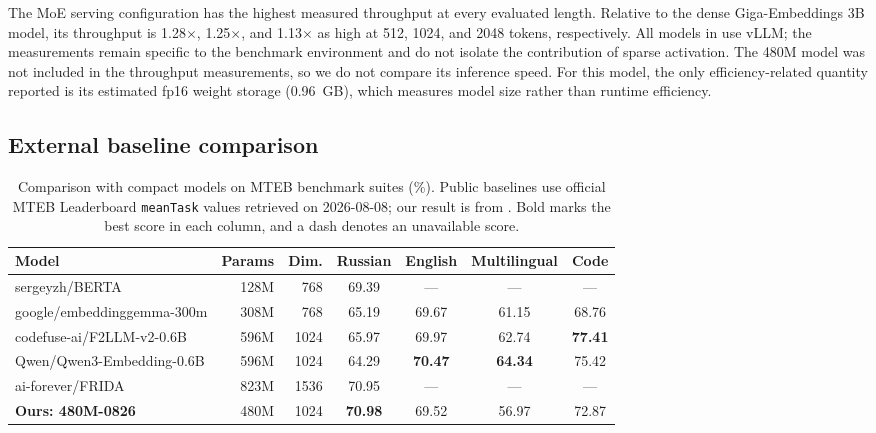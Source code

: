 \documentclass{article}
\begin{document}
The MoE serving configuration has the highest measured throughput at every evaluated length.
Relative to the dense Giga-Embeddings 3B model, its throughput is 1.28$\times$, 1.25$\times$, and 1.13$\times$ as high at 512, 1024, and 2048 tokens, respectively.
All models in  use vLLM; the measurements remain specific to the benchmark environment and do not isolate the contribution of sparse activation.
The 480M model was not included in the throughput measurements, so we do not compare its inference speed.
For this model, the only efficiency-related quantity reported is its estimated fp16 weight storage (0.96~GB), which measures model size rather than runtime efficiency.

\subsection{External baseline comparison}

\begin{table}[!t]
  \caption{Comparison with compact models on MTEB benchmark suites (\%). Public baselines use official MTEB Leaderboard \texttt{meanTask} values retrieved on 2026-08-08; our result is from . Bold marks the best score in each column, and a dash denotes an unavailable score.}
  \label{tab:baselines}
  \centering
  \small
  \setlength{\tabcolsep}{5pt}
  \begin{tabular}{lrrcccc}
    \toprule
    \textbf{Model} & \textbf{Params} & \textbf{Dim.} & \textbf{Russian} & \textbf{English} & \textbf{Multilingual} & \textbf{Code} \\
    \midrule
    sergeyzh/BERTA                              & 128M & 768  & 69.39 & --- & --- & --- \\
    google/embeddinggemma-300m                  & 308M & 768  & 65.19 & 69.67 & 61.15 & 68.76 \\
    codefuse-ai/F2LLM-v2-0.6B                   & 596M & 1024 & 65.97 & 69.97 & 62.74 & \textbf{77.41} \\
    Qwen/Qwen3-Embedding-0.6B                   & 596M & 1024 & 64.29 & \textbf{70.47} & \textbf{64.34} & 75.42 \\
    ai-forever/FRIDA                            & 823M & 1536 & 70.95 & --- & --- & --- \\
    \midrule
    \textbf{Ours: 480M-0826}                    & 480M & 1024 & \textbf{70.98} & 69.52 & 56.97 & 72.87 \\
    \bottomrule
  \end{tabular}
\end{table}
\end{document}
